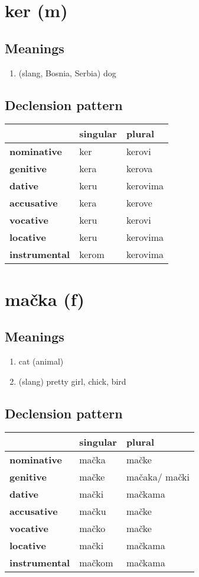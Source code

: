 \filbreak
\section{ker (m)}
\subsection*{Meanings}
\begin{enumerate}
\item (slang, Bosnia, Serbia) dog
\end{enumerate}
\subsection*{Declension pattern}
\begin{tabularx}{\linewidth}{Xll}
\toprule
{} & singular &    plural \\
\midrule
\textbf{nominative  } &      ker &    kerovi \\
\textbf{genitive    } &     kera &    kerova \\
\textbf{dative      } &     keru &  kerovima \\
\textbf{accusative  } &     kera &    kerove \\
\textbf{vocative    } &     keru &    kerovi \\
\textbf{locative    } &     keru &  kerovima \\
\textbf{instrumental} &    kerom &  kerovima \\
\bottomrule
\end{tabularx}

\filbreak
\section{mačka (f)}
\subsection*{Meanings}
\begin{enumerate}
\item cat (animal)
\item (slang) pretty girl, chick, bird
\end{enumerate}
\subsection*{Declension pattern}
\begin{tabularx}{\linewidth}{Xll}
\toprule
{} & singular &         plural \\
\midrule
\textbf{nominative  } &    mačka &          mačke \\
\textbf{genitive    } &    mačke &  mačaka/ mački \\
\textbf{dative      } &    mački &        mačkama \\
\textbf{accusative  } &    mačku &          mačke \\
\textbf{vocative    } &    mačko &          mačke \\
\textbf{locative    } &    mački &        mačkama \\
\textbf{instrumental} &   mačkom &        mačkama \\
\bottomrule
\end{tabularx}

